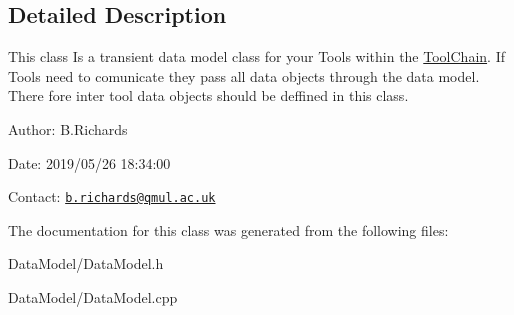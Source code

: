\subsection{Detailed Description}
This class Is a transient data model class for your Tools within the \hyperlink{classToolChain}{Tool\-Chain}. If Tools need to comunicate they pass all data objects through the data model. There fore inter tool data objects should be deffined in this class.

\begin{DoxyParagraph}{Author\-:}
B.\-Richards 
\end{DoxyParagraph}


\begin{DoxyParagraph}{Date\-:}
2019/05/26 18\-:34\-:00 
\end{DoxyParagraph}


Contact\-: \href{mailto:b.richards@qmul.ac.uk}{\tt b.\-richards@qmul.\-ac.\-uk} 

The documentation for this class was generated from the following files\-:\begin{DoxyCompactItemize}
\item 
Data\-Model/Data\-Model.\-h\item 
Data\-Model/Data\-Model.\-cpp\end{DoxyCompactItemize}
